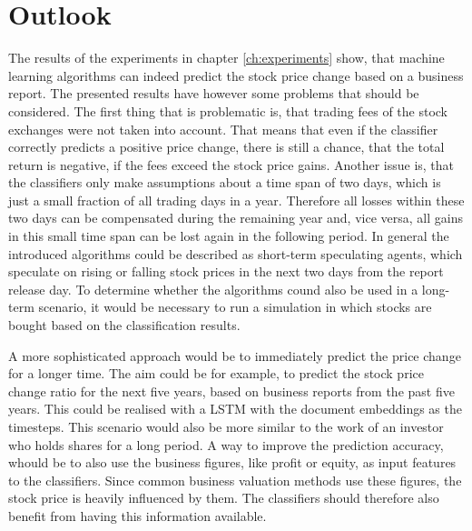 \chapter{Outlook}\label{ch:outlook}

The results of the experiments in chapter \ref{ch:experiments} show, that machine learning algorithms can indeed predict the stock price change based on a business report.
The presented results have however some problems that should be considered.
The first thing that is problematic is, that trading fees of the stock exchanges were not taken into account.
That means that even if the classifier correctly predicts a positive price change, there is still a chance, that the total return is negative, if the fees exceed the stock price gains.
Another issue is, that the classifiers only make assumptions about a time span of two days, which is just a small fraction of all trading days in a year.
Therefore all losses within these two days can be compensated during the remaining year and, vice versa, all gains in this small time span can be lost again in the following period.
In general the introduced algorithms could be described as short-term speculating agents, which speculate on rising or falling stock prices in the next two days from the report release day.
To determine whether the algorithms cound also be used in a long-term scenario, it would be necessary to run a simulation in which stocks are bought based on the classification results.

A more sophisticated approach would be to immediately predict the price change for a longer time.
The aim could be for example, to predict the stock price change ratio for the next five years, based on business reports from the past five years.
This could be realised with a \ac{LSTM} with the document embeddings as the timesteps.
This scenario would also be more similar to the work of an investor who holds shares for a long period.
A way to improve the prediction accuracy, whould be to also use the business figures, like profit or equity, as input features to the classifiers.
Since common business valuation methods use these figures, the stock price is heavily influenced by them.
The classifiers should therefore also benefit from having this information available.


